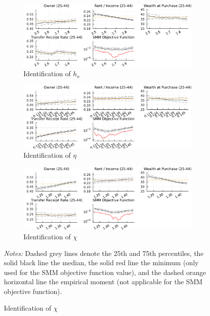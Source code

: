 \documentclass[12pt]{article}
\begin{document}
\begin{figure}\caption{Identification of $\eta,h_o,\chi$.}\label{fig:idall}
	\begin{subfigure}{\textwidth}\caption{Identification of $h_o$}\label{fig:hoid}
		\includegraphics[width=\textwidth]{../tabfig/est/identification/ho.pdf}
	\end{subfigure}
	\begin{subfigure}{\textwidth}\caption{Identification of $\eta$}\label{fig:etaid}
		\includegraphics[width=\textwidth]{../tabfig/est/identification/eta.pdf}
	\end{subfigure}
	\begin{subfigure}{\textwidth}\caption{Identification of $\chi$}\label{fig:chiid}
		\includegraphics[width=\textwidth]{../tabfig/est/identification/chi.pdf}
	\end{subfigure}
	{\begin{footnotesize} \textit{Notes:} Dashed grey lines denote the 25th and 75th percentiles, the solid black line the median, the solid red line the minimum (only used for the SMM objective function value), and the dashed orange horizontal line the empirical moment (not applicable for the SMM objective function).\end{footnotesize}}
\end{figure}
\end{document}
